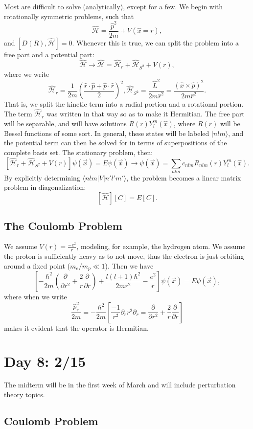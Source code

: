 \documentclass[fontsize=12pt]{scrartcl}
\newcommand{\ptl}{\partial}
\newcommand{\la}{\langle}
\newcommand{\ra}{\rangle}
\newcommand{\pos}{\hat{x}}
\newcommand{\mom}{\hat{p}}
\newcommand{\Ham}{\hat{\mathcal{H}}}
\begin{document}
Most are difficult to solve (analytically), except for a few. We begin with rotationally symmetric problems, such that $$\Ham=\frac{\mom^2}{2m}+V(\pos = r),$$ and $[D(R),\Ham]=0$. Whenever this is true, we can split the problem into a free part and a potential part: $$\Ham\to \Ham = \Ham_r+\Ham_{S^2}+V(r),$$ where we write $$\Ham_r = \frac{1}{2m}\left(\frac{\hat{r}\cdot\mom + \mom\cdot\hat{r}}{2}\right)^2, \Ham_{S^2} = \frac{\hat{L}^2}{2m\hat{r}^2}=\frac{(\pos\times\mom)^2}{2m\hat{r}^2}.$$ That is, we split the kinetic term into a radial portion and a rotational portion. The term $\Ham_r$ was written in that way so as to make it Hermitian. The free part will be separable, and will have solutions $R(r)Y_l^m(\pos)$, where $R(r)$ will be Bessel functions of some sort. In general, these states will be labeled $|nlm\ra$, and the potential term can then be solved for in terms of superpositions of the complete basis set. The stationary problem, then: $$\left[\Ham_r+\Ham_{S^2}+V(r)\right]\psi(\vec{x})=E\psi(\vec{x})\to \psi(\vec{x})=\sum_{nlm}c_{nlm}R_{nlm}(r)Y_l^m(\pos).$$ By explicitly determining $\la nlm|V|n'l'm'\ra$, the problem becomes a linear matrix problem in diagonalization: $$[\Ham][C]=E[C].$$

\subsection{The Coulomb Problem}

We assume $V(r)=\frac{-e^2}{r}$, modeling, for example, the hydrogen atom. We assume the proton is sufficiently heavy as to not move, thus the electron is just orbiting around a fixed point ($m_e/m_p\ll 1$). Then we have $$\left[-\frac{\hbar^2}{2m}\left(\frac{\ptl}{\ptl r^2}+\frac{2}{r}\frac{\ptl}{\ptl r}\right)+\frac{l(l+1)\hbar^2}{2mr^2}-\frac{e^2}{r}\right]\psi(\vec{x})=E\psi(\vec{x}),$$ where when we write $$\frac{\mom^2_r}{2m}=-\frac{\hbar^2}{2m}\left[\frac{-1}{r^2}\ptl_r r^2 \ptl_r = \frac{\ptl}{\ptl r^2}+\frac{2}{r}\frac{\ptl}{\ptl r}\right]$$ makes it evident that the operator is Hermitian.

\section{Day 8: 2/15}

The midterm will be in the first week of March and will include perturbation theory topics.

\subsection{Coulomb Problem}
\end{document}
